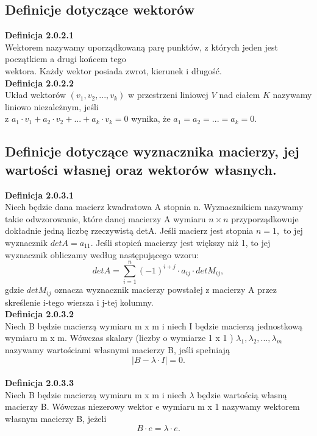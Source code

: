 \documentclass[10pt,a4paper]{report}
\begin{document}
\subsection{Definicje dotyczące wektorów} 

\noindent \textbf{Definicja 2.0.2.1}\\
\noindent Wektorem nazywamy uporządkowaną parę punktów, z których jeden jest początkiem a drugi końcem tego\\ wektora. Każdy wektor posiada zwrot, kierunek i długość.\\

\noindent \textbf{Definicja 2.0.2.2}\\
\noindent Układ wektorów  $ (v_{1}, v_{2}, ..., v_{k}) $ w przestrzeni liniowej $ V $ nad ciałem $ K $ nazywamy liniowo niezależnym, jeśli\\ z $ a_{1}\cdot v_{1}+ a_{2}\cdot v_{2} + ... + a_{k}\cdot v_{k} = 0 $ wynika, że $a_{1}=a_{2}=...=a_{k}=0 $.\\

\subsection{Definicje dotyczące wyznacznika macierzy, jej wartości własnej oraz wektorów własnych.}

\noindent \textbf{Definicja 2.0.3.1}\\
\noindent Niech będzie dana macierz kwadratowa A stopnia n. Wyznacznikiem nazywamy takie odwzorowanie, które danej macierzy A wymiaru $n \times n$ przyporządkowuje dokładnie jedną liczbę rzeczywistą detA. Jeśli macierz jest stopnia $n = 1, $ to jej wyznacznik $detA = a_{11}$. 
Jeśli stopień macierzy jest większy niż 1, to jej wyznacznik obliczamy według następującego wzoru: 
$$
detA = \sum_{i=1}^{n} (-1)^{i+j}\cdot a_{ij}\cdot detM_{ij},
$$
gdzie $detM_{ij}$ oznacza wyznacznik macierzy powstałej z macierzy A przez skreślenie i-tego wiersza i j-tej kolumny.\\
\newpage
\noindent \textbf{Definicja 2.0.3.2}\\
\noindent Niech B będzie macierzą wymiaru m x m i niech I będzie macierzą jednostkową wymiaru m x m. Wówczas skalary (liczby o wymiarze 1 x 1 ) $\lambda_{1}, \lambda_{2}, ..., \lambda_{m} $ nazywamy wartościami własnymi macierzy B, jeśli spełniają $$|B-\lambda\cdot I|=0. $$ \\

\noindent \textbf{Definicja 2.0.3.3}\\
\noindent Niech B będzie macierzą wymiaru m x m i niech $\lambda$ będzie wartością własną macierzy B. Wówczas niezerowy wektor e wymiaru m x 1 nazywamy wektorem własnym macierzy B, jeżeli $$B\cdot e = \lambda\cdot e. $$\\
\end{document}
